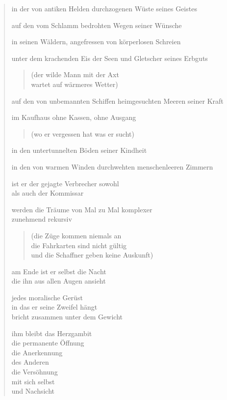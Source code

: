
\cleartoverso


\begin{verse}

in der von antiken Helden durchzogenen Wüste seines Geistes

auf den vom Schlamm bedrohten Wegen seiner Wünsche

in seinen Wäldern, angefressen von körperlosen Schreien

unter dem krachenden Eis der Seen und Gletscher seines Erbguts

\begin{quote}
(der wilde Mann mit der Axt\\
wartet auf wärmeres Wetter)
\end{quote}

auf den von unbemannten Schiffen heimgesuchten Meeren seiner Kraft

im Kaufhaus ohne Kassen, ohne Ausgang

\begin{quote}
(wo er vergessen hat was er sucht)
\end{quote}

in den untertunnelten Böden seiner Kindheit

in den von warmen Winden durchwehten menschenleeren Zimmern

ist er der gejagte Verbrecher sowohl\\
als auch der Kommissar

werden die Träume von Mal zu Mal komplexer\\
zunehmend rekursiv

\begin{quote}
(die Züge kommen niemals an\\
die Fahrkarten sind nicht gültig\\
und die Schaffner geben keine Auskunft)
\end{quote}

am Ende ist er selbst die Nacht\\
die ihn aus allen Augen ansieht

jedes moralische Gerüst\\
in das er seine Zweifel hängt\\
bricht zusammen unter dem Gewicht

ihm bleibt das Herzgambit\\
die permanente Öffnung\\
die Anerkennung\\
des Anderen\\
die Versöhnung\\
mit sich selbst\\
und Nachsicht


\end{verse}

